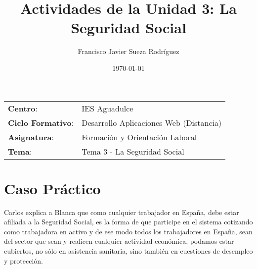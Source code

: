 


\title{
\vspace{10ex}
\normalfont \normalsize
\huge \textbf{Actividades de la Unidad 3: La Seguridad Social}
}
\author{Francisco Javier Sueza Rodríguez}
\date{\normalsize\today}



\maketitle

\thispagestyle{empty}

\vspace{75ex}

\begin{center}
    \begin{tabular}{l l}
        \textbf{Centro}: & IES Aguadulce \\
        \textbf{Ciclo Formativo}: & Desarrollo Aplicaciones Web (Distancia)\\
        \textbf{Asignatura}: & Formación y Orientación Laboral\\
        \textbf{Tema}: & Tema 3 -  La Seguridad Social\\
    \end{tabular}
\end{center}

\newpage

\tableofcontents

\newpage
\section{Caso Práctico}
Carlos explica a Blanca que como cualquier trabajador en España, debe estar afiliada a la Seguridad Social, es la forma de que participe en el sistema cotizando como trabajadora en activo y de ese modo todos los trabajadores en España, sean del sector que sean y realicen cualquier actividad económica, podamos estar cubiertos, no sólo en asistencia sanitaria, sino también en cuestiones de desempleo y protección.


